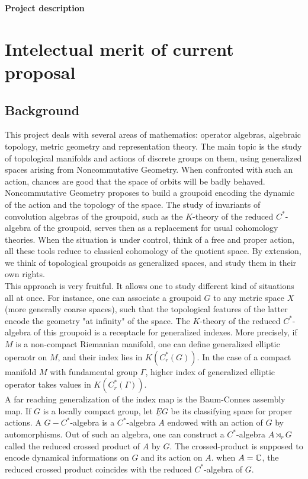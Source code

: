 \textbf{Project description}

\section{Intelectual merit of current proposal}

\subsection{Background}

This project deals with several areas of mathematics: operator algebras, algebraic topology, metric geometry and representation theory. The main topic is the study of topological manifolds and actions of discrete groups on them, using generalized spaces arising from Noncommutative Geometry. When confronted with such an action, chances are good that the space of orbits will be badly behaved. Noncommutative Geometry proposes to build a groupoid encoding the dynamic of the action and the topology of the space. The study of invariants of convolution algebras of the groupoid, such as the $K$-theory of the reduced $C^*$-algebra of the groupoid, serves then as a replacement for usual cohomology theories. When the situation is under control, think of a free and proper action, all these tools reduce to classical cohomology of the quotient space. By extension, we think of topological groupoids as generalized spaces, and study them in their own rights.\\

This approach is very fruitful. It allows one to study different kind of situations all at once. For instance, one can associate a groupoid $G$ to any metric space $X$ (more generally coarse spaces), such that the topological features of the latter encode the geometry "at infinity" of the space. The $K$-theory of the reduced $C^*$-algebra of this groupoid is a receptacle for generalized indexes. More precisely, if $M$ is a non-compact Riemanian manifold, one can define generalized elliptic operaotr on $M$, and their index lies in $K(C^*_r(G))$. In the case of a compact manifold $M$ with fundamental group $\Gamma$, higher index of generalized elliptic operator takes values in $K(C_r^*(\Gamma))$.\\

A far reaching generalization of the index map is the Baum-Connes assembly map. If $G$ is a locally compact group, let $\underline E G$ be its classifying space for proper actions. A $G-C^*$-algebra is a $C^*$-algebra $A$ endowed with an action of $G$ by automorphisms. Out of such an algebra, one can construct a $C^*$-algebra $A\rtimes_r G$ called the reduced crossed product of $A$ by $G$. The crossed-product is supposed to encode dynamical informations on $G$ and its action on $A$. when $A= \mathbb C$, the reduced crossed product coincides with the reduced $C^*$-algebra of $G$. \\

